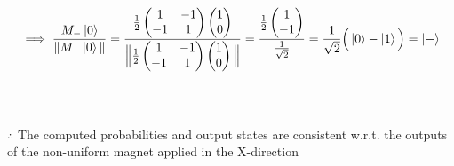 \documentclass[a4paper, 12pt]{article}
\begin{document}
\begin{flushleft}
\[\implies \frac{M_{-} \ket{0}}{\|M_{-} \ket{0}\|} = \frac{\frac{1}{2} \begin{pmatrix}
    1 & -1\\
    -1 & 1\\
\end{pmatrix} \begin{pmatrix}
    1 \\
    0 \\
\end{pmatrix}}{\Big\|\frac{1}{2} \begin{pmatrix}
     1 & -1 \\
    -1 &  1 \\
\end{pmatrix} \begin{pmatrix}
    1 \\
    0 \\
\end{pmatrix}\Big\|}  = \frac{\frac{1}{2}\begin{pmatrix}
    1 \\
    -1\\
\end{pmatrix}}{\frac{1}{\sqrt{2}}} = \frac{1}{\sqrt{2}}\Big( \ket{0} -\ket{1} \Big)=\ket{-}\]\\~\\ 

\begin{center}$\therefore$ The computed probabilities and output states are consistent w.r.t. the outputs of the non-uniform magnet applied in the X-direction \end{center}

\end{flushleft}
\end{document}
